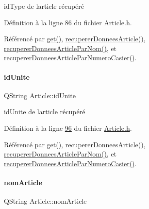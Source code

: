 id\+Type de l\textquotesingle{}article récupéré 



Définition à la ligne \hyperlink{_article_8h_source_l00086}{86} du fichier \hyperlink{_article_8h_source}{Article.\+h}.



Référencé par \hyperlink{_article_8cpp_source_l00266}{get()}, \hyperlink{_article_8cpp_source_l00050}{recuperer\+Donnees\+Article()}, \hyperlink{_article_8cpp_source_l00103}{recuperer\+Donnees\+Article\+Par\+Nom()}, et \hyperlink{_article_8cpp_source_l00156}{recuperer\+Donnees\+Article\+Par\+Numero\+Casier()}.

\mbox{\label{class_article_a702cff16cb9cd0774383ceba81d83869}} 
\paragraph{\texorpdfstring{id\+Unite}{idUnite}}
{\footnotesize\ttfamily Q\+String Article\+::id\+Unite\hspace{0.3cm}{\ttfamily [private]}}



id\+Unite de l\textquotesingle{}article récupéré 



Définition à la ligne \hyperlink{_article_8h_source_l00096}{96} du fichier \hyperlink{_article_8h_source}{Article.\+h}.



Référencé par \hyperlink{_article_8cpp_source_l00266}{get()}, \hyperlink{_article_8cpp_source_l00050}{recuperer\+Donnees\+Article()}, \hyperlink{_article_8cpp_source_l00103}{recuperer\+Donnees\+Article\+Par\+Nom()}, et \hyperlink{_article_8cpp_source_l00156}{recuperer\+Donnees\+Article\+Par\+Numero\+Casier()}.

\mbox{\label{class_article_a0ba6c08f7dd54e4b7caf673ecd6b41a6}} 
\paragraph{\texorpdfstring{nom\+Article}{nomArticle}}
{\footnotesize\ttfamily Q\+String Article\+::nom\+Article\hspace{0.3cm}{\ttfamily [private]}}



